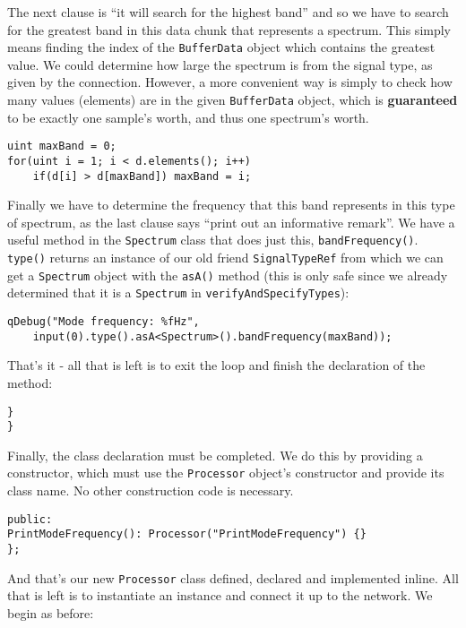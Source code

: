 The next clause is ``it will search for the highest band'' and so we have to search for the greatest band in this data chunk that represents a spectrum. This simply means finding the index of the \texttt{BufferData} object which contains the greatest value. We could determine how large the spectrum is from the signal type, as given by the connection. However, a more convenient way is simply to check how many values (elements) are in the given \texttt{BufferData} object, which is \textbf{guaranteed} to be exactly one sample's worth, and thus one spectrum's worth.

\begin{verbatim}
uint maxBand = 0;
for(uint i = 1; i < d.elements(); i++)
    if(d[i] > d[maxBand]) maxBand = i;
\end{verbatim}

Finally we have to determine the frequency that this band represents in this type of spectrum, as the last clause says ``print out an informative remark''. We have a useful method in the \texttt{Spectrum} class that does just this, \texttt{bandFrequency()}. \texttt{type()} returns an instance of our old friend  \texttt{SignalTypeRef} from which we can get a \texttt{Spectrum} object with the \texttt{asA()} method (this is only safe since we already determined that it is a \texttt{Spectrum} in \texttt{verifyAndSpecifyTypes}):

\begin{verbatim}
qDebug("Mode frequency: %fHz",
    input(0).type().asA<Spectrum>().bandFrequency(maxBand));
\end{verbatim}

That's it - all that is left is to exit the loop and finish the declaration of the method:

\begin{verbatim}
}
}
\end{verbatim}

Finally, the class declaration must be completed. We do this by providing a constructor, which must use the \texttt{Processor} object's constructor and provide its class name. No other construction code is necessary.

\begin{verbatim}
public:
PrintModeFrequency(): Processor("PrintModeFrequency") {}
};
\end{verbatim}

And that's our new \texttt{Processor} class defined, declared and implemented inline. All that is left is to instantiate an instance and connect it up to the network. We begin as before:


